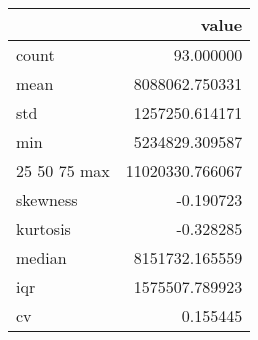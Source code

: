 \begin{tabular}{lr}
\toprule
 & value \\
\midrule
count & 93.000000 \\
mean & 8088062.750331 \\
std & 1257250.614171 \\
min & 5234829.309587 \\
25%
50%
75%
max & 11020330.766067 \\
skewness & -0.190723 \\
kurtosis & -0.328285 \\
median & 8151732.165559 \\
iqr & 1575507.789923 \\
cv & 0.155445 \\
\bottomrule
\end{tabular}
